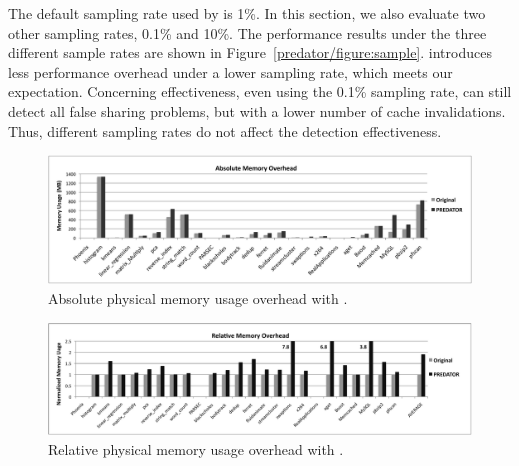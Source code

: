 The default sampling rate used by \Predator{} is 1\%. In this section, we also evaluate two other sampling rates, 0.1\% and 10\%. The performance results under the three different sample rates are shown in Figure~\ref{predator/figure:sample}. \Predator{} introduces less performance overhead under a lower sampling rate, which meets our expectation. Concerning effectiveness, even using the 0.1\% sampling rate, \Predator{} can still detect all false sharing problems, but with a lower number of cache invalidations. Thus, different sampling rates do not affect the detection effectiveness.
 
\begin{figure}[!t]
\centering
\includegraphics[width=6in]{predator/figure/absolutememory}
\caption{Absolute physical memory usage overhead with \Predator{}.}
\label{fig:absolutememusage}
\end{figure}

\begin{figure}[!t]
\centering
\includegraphics[width=6in]{predator/figure/memusage}
\caption{Relative physical memory usage overhead with \Predator{}.}
\label{fig:memusage}
\end{figure}

